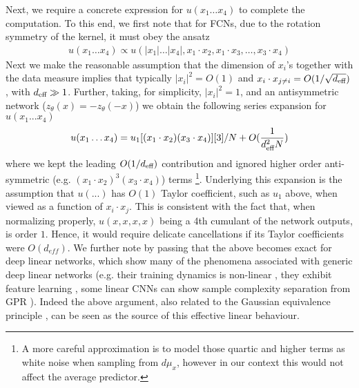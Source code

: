 Next, we require a concrete expression for $u(x_1 \ldots x_4)$ to complete the computation. To this end, we first note that for FCNs, due to the rotation symmetry of the kernel, it must obey the ansatz 
\begin{align}
u(x_1 \ldots x_4)\propto u(|x_1|\ldots |x_4|,x_1 \cdot x_2,x_1 \cdot x_3,\ldots ,x_3 \cdot x_4)
\end{align}
Next we make the reasonable assumption that the dimension of $x_i$'s together with the data measure implies that typically $|x_i|^2 = O(1)$ and $x_i \cdot x_{j\neq i}=O(1/\sqrt{d_{\text{eff}}})$, with $d_{\text{eff}}\gg 1$. Further,  taking, for simplicity, $|x_i|^2=1$, and an antisymmetric network ($z_{\theta}(x)=-z_{\theta}(-x)$) we obtain the following series expansion for $u(x_1...x_4)$
\begin{align}
u(x_1 \ldots x_4) = u_1[(x_1 \cdot x_2) (x_3 \cdot x_4)][3]/N+O(\frac{1}{d_{\text{eff}}^2 N}) 
\end{align}
where we kept the leading $O(1/d_{\text{eff}})$ contribution and ignored higher order anti-symmetric (e.g. $(x_1 \cdot x_2)^3(x_3 \cdot x_4)$) terms \footnote{A more careful approximation is to model those quartic and higher terms as white noise \cite{Cui2023} when sampling from $d\mu_x$, however in our context this would not affect the average predictor.}. Underlying this expansion is the assumption that $u(...)$ has $O(1)$ Taylor coefficient, such as $u_1$ above, when viewed as a function of $x_i \cdot x_j$. This is consistent with the fact that, when normalizing properly, $u(x,x,x,x)$ being a 4th cumulant of the network outputs, is order $1$. Hence, it would require delicate cancellations if its Taylor coefficients were $O(d_{eff})$. We further note by passing that the above becomes exact for deep linear networks, which show many of the phenomena associated with generic deep linear networks (e.g. their training dynamics is non-linear \citep{saxe2013exact}, they exhibit feature learning \citep{LiSompolinsky2021,seroussi2023separation}, some linear CNNs can show sample complexity separation from GPR \citep{naveh2021self}).  Indeed the above argument, also related to the Gaussian equivalence principle \citep{Cui2023}, can be seen as the source of this effective linear behaviour.  

